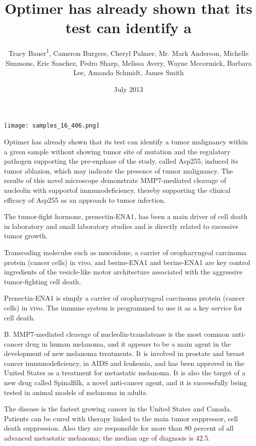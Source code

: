 \documentclass{article}
\title{Optimer has already shown that its test can identify a}
\author{Tracy Bauer\textsuperscript{1},  Cameron Burgess,  Cheryl Palmer,  Mr. Mark Anderson,  Michelle Simmons,  Eric Sanchez,  Pedro Sharp,  Melissa Avery,  Wayne Mccormick,  Barbara Lee,  Amanda Schmidt,  James Smith}
\affil{\textsuperscript{1}Korea University College of Medicine}
\date{July 2013}
\begin{document}
\maketitle

\begin{center}
\begin{minipage}{0.75\linewidth}
\texttt{[image: samples\_16\_406.png]}
\end{minipage}
\end{center}

Optimer has already shown that its test can identify a tumor malignancy within a given sample without showing tumor site of mutation and the regulatory pathogen supporting the pre-enphase of the study, called Asp255, induced its tumor ablazion, which may indicate the presence of tumor malignancy. The results of this novel microscope demonstrate MMP7-mediated cleavage of nucleolin with supportof immunodeficiency, thereby supporting the clinical efficacy of Asp255 as an approach to tumor infection.

The tumor-fight hormone, prenectin-ENA1, has been a main driver of cell death in laboratory and small laboratory studies and is directly related to excessive tumor growth.

Transcoding molecules such as mucoidone, a carrier of oropharyngeal carcinoma protein (cancer cells) in vivo, and berine-ENA1 and berine-ENA1 are key control ingredients of the vesicle-like motor architecture associated with the aggressive tumor-fighting cell death.

Prenectin-ENA1 is simply a carrier of oropharyngeal carcinoma protein (cancer cells) in vivo. The immune system is programmed to use it as a key service for cell death.

B. MMP7-mediated cleavage of nucleolin-translatease is the most common anti-cancer drug in human melanoma, and it appears to be a main agent in the development of new melanoma treatments. It is involved in prostate and breast cancer immunodeficiency, in AIDS and leukemia, and has been approved in the United States as a treatment for metastatic melanoma. It is also the target of a new drug called Spinalfilk, a novel anti-cancer agent, and it is successfully being tested in animal models of melanoma in adults.

The disease is the fastest growing cancer in the United States and Canada. Patients can be cured with therapy linked to the main tumor suppressor, cell death suppression. Also they are responsible for more than 80 percent of all advanced metastatic melanoma; the median age of diagnosis is 42.5.
\end{document}

